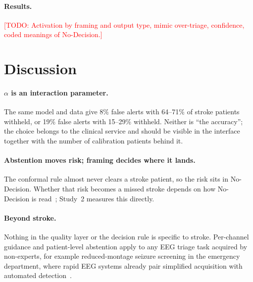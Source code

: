 \documentclass[sigconf,review,anonymous]{acmart}
\newcommand{\TODO}[1]{\textcolor{red}{[TODO: #1]}}
\begin{document}
\paragraph{Results.}
\TODO{Activation by framing and output type, mimic over-triage, confidence, coded meanings of No-Decision.}

\section{Discussion}

\paragraph{$\alpha$ is an interaction parameter.}
The same model and data give 8\% false alerts with 64--71\% of stroke patients withheld, or 19\% false alerts with 15--29\% withheld. Neither is ``the accuracy''; the choice belongs to the clinical service and should be visible in the interface together with the number of calibration patients behind it.

\paragraph{Abstention moves risk; framing decides where it lands.}
The conformal rule almost never clears a stroke patient, so the risk sits in No-Decision. Whether that risk becomes a missed stroke depends on how No-Decision is read~\cite{jabbour2025}; Study~2 measures this directly.

\paragraph{Beyond stroke.}
Nothing in the quality layer or the decision rule is specific to stroke. Per-channel guidance and patient-level abstention apply to any EEG triage task acquired by non-experts, for example reduced-montage seizure screening in the emergency department, where rapid EEG systems already pair simplified acquisition with automated detection~\cite{richard2024rapideeg}.
\end{document}
